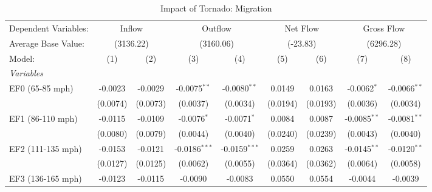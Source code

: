 \documentclass[letterpaper]{article}
\begin{document}
\begin{table}[H]
    \centering
    
    \caption{Impact of Tornado: Migration}
    \label{t1}
    \small
\begin{tabular}{lcccccccc}
   \tabularnewline \midrule \midrule
   Dependent Variables: & \multicolumn{2}{c}{Inflow} & \multicolumn{2}{c}{Outflow} & \multicolumn{2}{c}{Net Flow} & \multicolumn{2}{c}{Gross Flow}\\
   Average Base Value: & \multicolumn{2}{c}{(3136.22)} & \multicolumn{2}{c}{(3160.06)} & \multicolumn{2}{c}{(-23.83)} & \multicolumn{2}{c}{(6296.28)}\\ 
   Model:          & (1)                    & (2)                    & (3)                    & (4)                     & (5)          & (6)             & (7)                     & (8)\\  
   \midrule
   \emph{Variables}\\
   EF0 (65-85 mph) & -0.0023                & -0.0029                & -0.0075$^{**}$         & -0.0080$^{**}$          & 0.0149       & 0.0163          & -0.0062$^{*}$           & -0.0066$^{**}$\\   
                   & (0.0074)               & (0.0073)               & (0.0037)               & (0.0034)                & (0.0194)     & (0.0193)        & (0.0036)                & (0.0034)\\   
   EF1 (86-110 mph) & -0.0115                & -0.0109                & -0.0076$^{*}$          & -0.0071$^{*}$           & 0.0084       & 0.0087          & -0.0085$^{**}$          & -0.0081$^{**}$\\   
                   & (0.0080)               & (0.0079)               & (0.0044)               & (0.0040)                & (0.0240)     & (0.0239)        & (0.0043)                & (0.0040)\\   
   EF2 (111-135 mph) & -0.0153                & -0.0121                & -0.0186$^{***}$        & -0.0159$^{***}$         & 0.0259       & 0.0263          & -0.0145$^{**}$          & -0.0120$^{**}$\\   
                   & (0.0127)               & (0.0125)               & (0.0062)               & (0.0055)                & (0.0364)     & (0.0362)        & (0.0064)                & (0.0058)\\   
   EF3 (136-165 mph) & -0.0123                & -0.0115                & -0.0090                & -0.0083                 & 0.0550       & 0.0554          & -0.0044                 & -0.0039\\   

\end{tabular}
\end{table}
\end{document}
